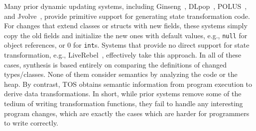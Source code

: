 \documentclass[natbib]{sigplanconf}
\newcommand{\code}[1]{\lstinline|#1|\xspace}
\newcommand{\TOS}{TOS\xspace}
\newcommand{\mwh}[1]{\textcolor{blue}{Mike: #1}}
\begin{document}
Many prior dynamic updating systems, including
Ginseng~\cite{neamtiu06dsu}, DLpop~\cite{HicksNettles03},
POLUS~\cite{chen:icse07}, and Jvolve~\cite{jvolve}, provide primitive
support for generating state transformation code.  For changes that
extend classes or structs with new fields, these systems
simply copy the old fields and initialize the new ones with default
values, e.g., \code{null} for object references, or 0 for
\code{int}$\!$s.  Systems that provide no direct support for state
transformation, e.g., LiveRebel~\cite{javarebel}, effectively take
this approach.  In all of these cases, synthesis is based entirely on
comparing the definitions of changed types/classes.  None of them
consider semantics by analyzing the code or the heap.  By contrast,
\TOS obtains semantic information from program execution to derive
data transformations.
In short, while prior systems remove some of the tedium of writing
transformation functions, they fail to handle any interesting program
changes, which are exactly the cases which are harder
for programmers to write correctly.




\end{document}
